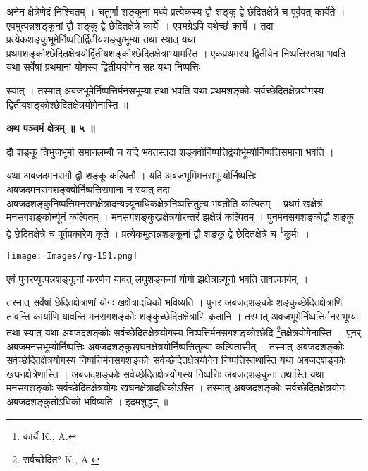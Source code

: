 \documentclass[11pt, openany]{book}
\begin{document}
अनेन क्षेत्रेणेदं निश्चितम् । चतुर्णां शङ्कूनां मध्ये प्रत्येकस्य द्वौ शङ्कू द्वे छेदितक्षेत्रे च पूर्ववत् कार्येते । एवमुत्पन्नशङ्कूनां द्वौ शङ्कू द्वे छेदितक्षेत्रे कार्ये~। एवमग्रेऽपि यथेच्छं कार्ये । तदा
प्रत्येकशङ्कुभूमेर्निष्पत्तिर्द्वितीयशङ्कुभूम्या तथा स्यात् यथा प्रथमशङ्कोश्छेदितक्षेत्रयोर्द्वितीयशङ्कोश्छेदितक्षेत्राभ्यामस्ति । एकप्रथमस्य द्वितीयेन निष्पत्तिस्तथा भवति यथा सर्वेषां प्रथमानां योगस्य द्वितीययोगेन सह यथा निष्पत्तिः

\newpage
\noindent स्यात् । तस्मात् अबजभूमेर्निष्पत्तिर्मनसभूम्या तथा भवति यथा प्रथमशङ्कोः सर्वच्छेदितक्षेत्रयोगस्य द्वितीयशङ्कोश्छेदितक्षेत्रयोगेनास्ति ॥ \\
\begin{center}
\textbf{\large अथ पञ्चमं क्षेत्रम् ॥ ५ ॥\\}
\end{center}
\vspace{5mm}

{\ab द्वौ शङ्कू त्रिभुजभूमी समानलम्बौ च यदि भवतस्तदा शङ्क्वोर्निष्पत्तिर्द्वयोर्भूम्योर्निष्पत्तिसमाना भवति । }\\
\vspace{5mm}

 यथा अबजदमनसगौ द्वौ शङ्कू कल्पितौ । यदि अबजभूमिमनसभूम्योर्निष्पत्तिः अबजदमनसगशङ्क्वोर्निष्पत्तिसमाना न स्यात् तदा अबजदशङ्कुनिष्पत्तिमनसगक्षेत्रादन्यन्न्यूनाधिकक्षेत्रनिष्पत्तितुल्य भवतीति कल्पितम् । प्रथमं खक्षेत्रं मनसगशङ्कोर्न्यूनं कल्पितम् । मनसगशङ्कुखक्षेत्रयोरन्तरं झक्षेत्रं कल्पितम् । 
 पुनर्मनसगशङ्कोर्द्वौ शङ्कू द्वे छेदितक्षेत्रे च पूर्वप्रकारेण कृते । प्रत्येकमुत्पन्नशङ्कूनां द्वौ शङ्कू द्वे छेदितक्षेत्रे च \renewcommand{\thefootnote}{१}\footnote{कार्ये {\en K., A.}}कुर्मः~। 
\begin{center}
\texttt{[image: Images/rg-151.png]}  
\end{center}
एवं पुनरप्युत्पन्नशङ्कूनां करणेन यावत् लघुशङ्कनां योगो झक्षेत्रान्न्यूनो भवति तावत्कार्यम्~।

\newpage

\noindent तस्मात् सर्वेषां छेदितक्षेत्राणां योगः खक्षेत्रादधिको भविष्यति । पुनर अबजदशङ्कोः शङ्कुच्छेदितक्षेत्राणि तावन्ति कार्याणि यावन्ति मनसगशङ्कोः शङ्कुच्छेदितक्षेत्राणि कृतानि । तस्मात्
अवजभूमेर्निष्पत्तिर्मनसभूम्या तथा स्यात् यथा अबजदशङ्कोः सर्वच्छेदितक्षेत्रयोगस्य निष्पत्तिर्मनसगशङ्कोश्छेदि \renewcommand{\thefootnote}{१}
\footnote{सर्वच्छेदित° {\en K., A.}}तक्षेत्रयोगेनास्ति~। पुनर् अबजमनसभूम्योर्निष्पत्तिः अबजदशङ्कुखघनक्षेत्रयोर्निष्पत्तितुल्या कल्पितासीत् । तस्मात् अबजदशङ्कोः सर्वच्छेदितक्षेत्रयोगस्य निष्पत्तिर्मनसगशङ्कोः सर्वच्छेदितक्षेत्रयोगेन निष्पत्तिस्तथास्ति यथा अबजदशङ्कोः खघनक्षेत्रेणास्ति । अबजदशङ्कोः सर्वच्छेदितक्षेत्रयोगस्य निष्पत्तिः अबजदशङ्कुना तथास्ति यथा मनसगशङ्कोः सर्वच्छेदितक्षेत्रयोगः खघनक्षेत्रादधिकोऽस्ति । तस्मात् अबजदशङ्कोः
सर्वच्छेदितक्षेत्रयोगः अबजदशङ्कुतोऽधिको भविष्यति । इदमशुद्धम् ॥ \\
\vspace{5mm}
\end{document}

